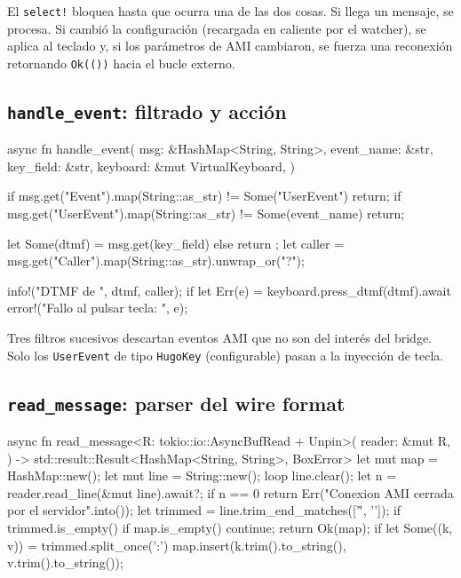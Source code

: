El \texttt{select!} bloquea hasta que ocurra una de las dos cosas. Si llega un mensaje, se procesa. Si cambió la configuración (recargada en caliente por el watcher), se aplica al teclado y, si los parámetros de AMI cambiaron, se fuerza una reconexión retornando \texttt{Ok(())} hacia el bucle externo.

\subsection{\texttt{handle\_event}: filtrado y acción}

\begin{rustcode}
async fn handle_event(
    msg: &HashMap<String, String>,
    event_name: &str,
    key_field: &str,
    keyboard: &mut VirtualKeyboard,
) {
    if msg.get("Event").map(String::as_str) != Some("UserEvent") { return; }
    if msg.get("UserEvent").map(String::as_str) != Some(event_name) { return; }

    let Some(dtmf) = msg.get(key_field) else { return };
    let caller = msg.get("Caller").map(String::as_str).unwrap_or("?");

    info!("DTMF {} de {}", dtmf, caller);
    if let Err(e) = keyboard.press_dtmf(dtmf).await {
        error!("Fallo al pulsar tecla: {}", e);
    }
}
\end{rustcode}

Tres filtros sucesivos descartan eventos AMI que no son del interés del bridge. Solo los \texttt{UserEvent} de tipo \texttt{HugoKey} (configurable) pasan a la inyección de tecla.

\subsection{\texttt{read\_message}: parser del wire format}

\begin{rustcode}
async fn read_message<R: tokio::io::AsyncBufRead + Unpin>(
    reader: &mut R,
) -> std::result::Result<HashMap<String, String>, BoxError> {
    let mut map = HashMap::new();
    let mut line = String::new();
    loop {
        line.clear();
        let n = reader.read_line(&mut line).await?;
        if n == 0 {
            return Err("Conexion AMI cerrada por el servidor".into());
        }
        let trimmed = line.trim_end_matches(['\r', '\n']);
        if trimmed.is_empty() {
            if map.is_empty() { continue; }
            return Ok(map);
        }
        if let Some((k, v)) = trimmed.split_once(':') {
            map.insert(k.trim().to_string(), v.trim().to_string());
        }
    }
}
\end{rustcode}

